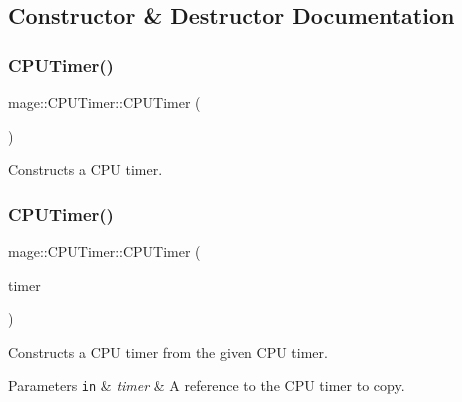 \subsection{Constructor \& Destructor Documentation}
\hypertarget{classmage_1_1_c_p_u_timer_a398b1d5c99bcb09fbe37b2d74547b3e0}{}\label{classmage_1_1_c_p_u_timer_a398b1d5c99bcb09fbe37b2d74547b3e0} 
\subsubsection{\texorpdfstring{C\+P\+U\+Timer()}{CPUTimer()}\hspace{0.1cm}{\footnotesize\ttfamily [1/3]}}
{\footnotesize\ttfamily mage\+::\+C\+P\+U\+Timer\+::\+C\+P\+U\+Timer (\begin{DoxyParamCaption}{ }\end{DoxyParamCaption})}

Constructs a C\+PU timer. \hypertarget{classmage_1_1_c_p_u_timer_a35d279dc760a491537099262892c62d5}{}\label{classmage_1_1_c_p_u_timer_a35d279dc760a491537099262892c62d5} 
\subsubsection{\texorpdfstring{C\+P\+U\+Timer()}{CPUTimer()}\hspace{0.1cm}{\footnotesize\ttfamily [2/3]}}
{\footnotesize\ttfamily mage\+::\+C\+P\+U\+Timer\+::\+C\+P\+U\+Timer (\begin{DoxyParamCaption}\item[{const \hyperlink{classmage_1_1_c_p_u_timer}{C\+P\+U\+Timer} \&}]{timer }\end{DoxyParamCaption})\hspace{0.3cm}{\ttfamily [default]}}

Constructs a C\+PU timer from the given C\+PU timer.


\begin{DoxyParams}[1]{Parameters}
\mbox{\tt in}  & {\em timer} & A reference to the C\+PU timer to copy. \\
\hline
\end{DoxyParams}
\hypertarget{classmage_1_1_c_p_u_timer_a1f416a6188d447fb24396cc4409af7aa}{}\label{classmage_1_1_c_p_u_timer_a1f416a6188d447fb24396cc4409af7aa} 
